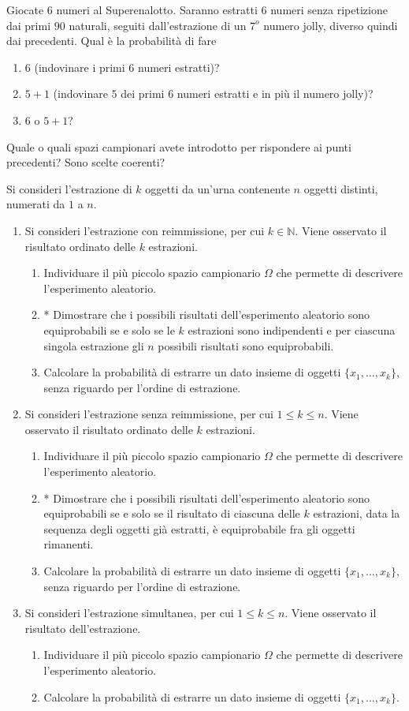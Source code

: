 Giocate $6$ numeri al Superenalotto. Saranno estratti $6$ numeri senza ripetizione dai primi $90$ naturali, seguiti dall'estrazione di un $7^{o}$ numero jolly, diverso quindi dai precedenti. Qual è la probabilità di fare
\begin{enumerate}
\item $6$ (indovinare i primi $6$ numeri estratti)?
\item $5+1$ (indovinare $5$ dei primi $6$ numeri estratti e in più il numero jolly)?
\item $6$ o $5+1$?
\end{enumerate}

Quale o quali spazi campionari avete introdotto per rispondere ai punti precedenti? Sono scelte coerenti?
\Esercizio{}

Si consideri l'estrazione di $k$ oggetti da un'urna contenente $n$ oggetti distinti, numerati da $1$ a $n$.
\begin{enumerate}
\item Si consideri l'estrazione con reimmissione, per cui $k\in \mathbb{N}$. Viene osservato il risultato ordinato delle $k$ estrazioni.
\begin{enumerate}
\item Individuare il più piccolo spazio campionario $\Omega $ che permette di descrivere l'esperimento aleatorio.
\item * Dimostrare che i possibili risultati dell'esperimento aleatorio sono equiprobabili se e solo se le $k$ estrazioni sono indipendenti e per ciascuna singola estrazione gli $n$ possibili risultati sono equiprobabili.
\item Calcolare la probabilità di estrarre un dato insieme di oggetti $\{x_{1} ,\dots ,x_{k}\}$, senza riguardo per l'ordine di estrazione.
\end{enumerate}
\item Si consideri l'estrazione senza reimmissione, per cui $1\leq k\leq n$. Viene osservato il risultato ordinato delle $k$ estrazioni.
\begin{enumerate}
\item Individuare il più piccolo spazio campionario $\Omega $ che permette di descrivere l'esperimento aleatorio.
\item * Dimostrare che i possibili risultati dell'esperimento aleatorio sono equiprobabili se e solo se il risultato di ciascuna delle $k$ estrazioni, data la sequenza degli oggetti già estratti, è equiprobabile fra gli oggetti rimanenti.
\item Calcolare la probabilità di estrarre un dato insieme di oggetti $\{x_{1} ,\dots ,x_{k}\}$, senza riguardo per l'ordine di estrazione.
\end{enumerate}
\item Si consideri l'estrazione simultanea, per cui $1\leq k\leq n$. Viene osservato il risultato dell'estrazione.
\begin{enumerate}
\item Individuare il più piccolo spazio campionario $\Omega $ che permette di descrivere l'esperimento aleatorio.
\item Calcolare la probabilità di estrarre un dato insieme di oggetti $\{x_{1} ,\dots ,x_{k}\}$.
\end{enumerate}
\end{enumerate}
